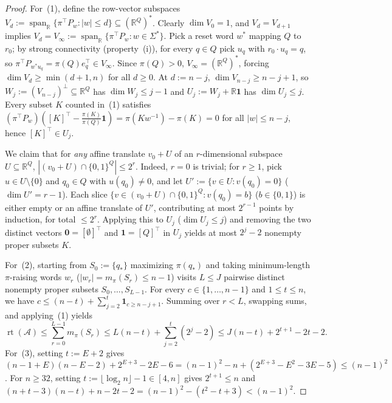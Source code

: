 \documentclass[11pt,a4paper]{article}
\theoremstyle{definition}
\theoremstyle{remark}
\newcommand{\rt}{\operatorname{rt}}
\newcommand{\one}{\mathbf{1}}
\newcommand{\R}{\mathbb{R}}
\newcommand{\cA}{\mathcal{A}}
\newcommand{\ind}[1]{[#1]}
\begin{document}
\begin{proof}
For~(1), define the row-vector subspaces $V_d := \operatorname{span}_\R\{\pi^\top P_w : |w| \le d\} \subseteq (\R^Q)^*$. Clearly $\dim V_0 = 1$, and $V_d = V_{d+1}$ implies $V_d = V_\infty := \operatorname{span}_\R\{\pi^\top P_w : w \in \Sigma^*\}$. Pick a reset word $w^*$ mapping $Q$ to $r_0$; by strong connectivity (property~(i)), for every $q \in Q$ pick $u_q$ with $r_0 \cdot u_q = q$, so $\pi^\top P_{w^* u_q} = \pi(Q) e_q^\top \in V_\infty$. Since $\pi(Q) > 0$, $V_\infty = (\R^Q)^*$, forcing $\dim V_d \ge \min(d + 1, n)$ for all $d \ge 0$. At $d := n - j$, $\dim V_{n-j} \ge n - j + 1$, so $W_j := (V_{n-j})^\perp \subseteq \R^Q$ has $\dim W_j \le j - 1$ and $U_j := W_j + \R\one$ has $\dim U_j \le j$. Every subset $K$ counted in~(1) satisfies $(\pi^\top P_w)(\ind{K}^\top - \frac{\pi(K)}{\pi(Q)}\one) = \pi(K w^{-1}) - \pi(K) = 0$ for all $|w| \le n - j$, hence $\ind{K}^\top \in U_j$.

We claim that for \emph{any} affine translate $v_0 + U$ of an $r$-dimensional subspace $U \subseteq \R^Q$, $|(v_0 + U) \cap \{0, 1\}^Q| \le 2^r$. Indeed, $r = 0$ is trivial; for $r \ge 1$, pick $u \in U \setminus \{0\}$ and $q_0 \in Q$ with $u(q_0) \neq 0$, and let $U' := \{v \in U : v(q_0) = 0\}$ ($\dim U' = r - 1$). Each slice $\{v \in (v_0 + U) \cap \{0,1\}^Q : v(q_0) = b\}$ ($b \in \{0, 1\}$) is either empty or an affine translate of $U'$, contributing at most $2^{r-1}$ points by induction, for total $\le 2^r$. Applying this to $U_j$ ($\dim U_j \le j$) and removing the two distinct vectors $\mathbf{0} = \ind{\emptyset}^\top$ and $\one = \ind{Q}^\top$ in $U_j$ yields at most $2^j - 2$ nonempty proper subsets $K$.

For~(2), starting from $S_0 := \{q_*\}$ maximizing $\pi(q_*)$ and taking minimum-length $\pi$-raising words $w_r$ ($|w_r| = m_\pi(S_r) \le n - 1$) visits $L \le J$ pairwise distinct nonempty proper subsets $S_0, \dots, S_{L-1}$. For every $c \in \{1, \dots, n - 1\}$ and $1 \le t \le n$, we have $c \le (n - t) + \sum_{j=2}^t \one_{c \ge n - j + 1}$. Summing over $r < L$, swapping sums, and applying~(1) yields
\[
  \rt(\cA) \le \sum_{r=0}^{L-1} m_\pi(S_r) \le L(n - t) + \sum_{j=2}^t (2^j - 2) \le J(n - t) + 2^{t+1} - 2t - 2.
\]
For~(3), setting $t := E + 2$ gives $(n - 1 + E)(n - E - 2) + 2^{E+3} - 2E - 6 = (n - 1)^2 - n + (2^{E+3} - E^2 - 3E - 5) \le (n - 1)^2$. For $n \ge 32$, setting $t := \lfloor\log_2 n\rfloor - 1 \in [4, n]$ gives $2^{t+1} \le n$ and $(n + t - 3)(n - t) + n - 2t - 2 = (n - 1)^2 - (t^2 - t + 3) < (n - 1)^2$.
\end{proof}
\end{document}
